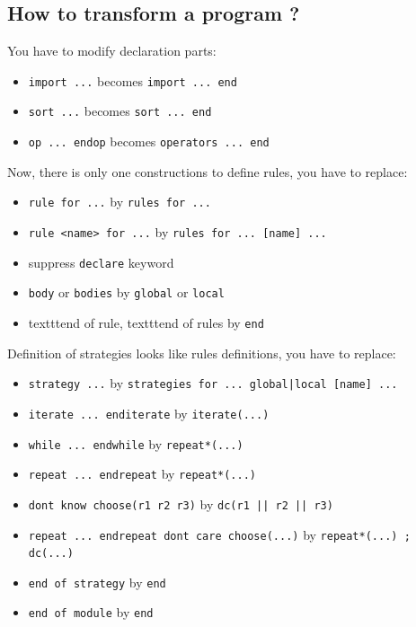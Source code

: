 \documentclass{article}
\begin{document}
  { \sym{;} }



\subsection{How to transform a program ?}
You have to modify declaration parts:
\begin{itemize}
\item \texttt{import ...} becomes \texttt{import ... end}
\item \texttt{sort ...} becomes \texttt{sort ... end}
\item \texttt{op ... endop} becomes \texttt{operators ... end}
\end{itemize}

Now, there is only one constructions to define rules, you have to
replace: 
\begin{itemize}
\item \texttt{rule for ...} by \texttt{rules for ...}
\item \texttt{rule <name> for ...} by \texttt{rules for ... [name] ...}
\item suppress \texttt{declare} keyword
\item \texttt{body} or \texttt{bodies} by \texttt{global} or
  \texttt{local}
\item texttt{end of rule}, texttt{end of rules} by \texttt{end}
\end{itemize}

Definition of strategies looks like rules definitions, you have to
replace: 
\begin{itemize}
\item \texttt{strategy ...} by \texttt{strategies for ... global|local
    [name] ...} 
\item \texttt{iterate ... enditerate} by \texttt{iterate(...)}
\item \texttt{while ... endwhile} by \texttt{repeat*(...)}
\item \texttt{repeat ... endrepeat} by \texttt{repeat*(...)}
\item \texttt{dont know choose(r1 r2 r3)} by \texttt{dc(r1 || r2 ||
    r3)}
\item \texttt{repeat ... endrepeat dont care choose(...)} by
  \texttt{repeat*(...) ; dc(...)}
\item \texttt{end of strategy} by \texttt{end}
\item \texttt{end of module} by \texttt{end}
\end{itemize}
\end{document}
